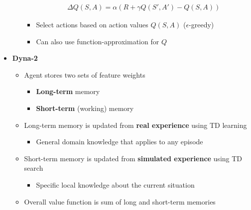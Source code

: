 \documentclass[12pt]{article}
\begin{document}
\begin{itemize}
\begin{itemize}
\begin{itemize}
\begin{gather*}
          \Delta Q(S, A) = \alpha (R + \gamma Q(S', A') - Q(S, A))
        \end{gather*}
        \item Select actions based on action values $Q(S, A)$ ($\epsilon$-greedy)
        \item Can also use function-approximation for $Q$
      \end{itemize}
    \end{itemize}
    \item \textbf{Dyna-2}
    \begin{itemize}
      \item Agent stores two sets of feature weights
      \begin{itemize}
        \item \textbf{Long-term} memory
        \item \textbf{Short-term} (working) memory
      \end{itemize}
      \item Long-term memory is updated from \textbf{real experience}
      using TD learning
      \begin{itemize}
        \item General domain knowledge that applies to any episode
      \end{itemize}
      \item Short-term memory is updated from \textbf{simulated experience}
      using TD search
      \begin{itemize}
        \item Specific local knowledge about the current situation
      \end{itemize}
      \item Overall value function is sum of long and short-term memories
    \end{itemize}
  \end{itemize}
\end{document}
